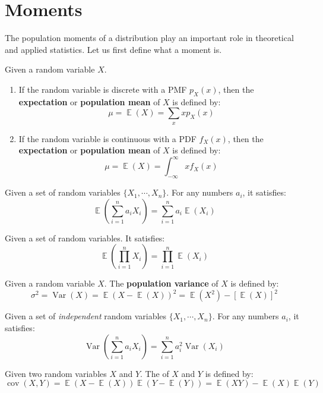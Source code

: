 \documentclass{huhtakm-template-book-v2}
\DeclareMathOperator{\E}{\mathbb{E}}
\DeclareMathOperator{\Var}{Var}
\DeclareMathOperator{\cov}{cov}
\begin{document}
\section{Moments}
The population moments of a distribution play an important role in theoretical and applied statistics. Let us first define what a moment is.
\begin{defn}
	Given a random variable $X$.
	\begin{enumerate}
		\item If the random variable is discrete with a PMF $p_{X}(x)$, then the \textbf{expectation} or \textbf{population mean} of $X$ is defined by:
		\begin{equation*}
			\mu=\E(X)=\sum_{x}xp_{X}(x)
		\end{equation*}
		\item If the random variable is continuous with a PDF $f_{X}(x)$, then the \textbf{expectation} or \textbf{population mean} of $X$ is defined by:
		\begin{equation*}
			\mu=\E(X)=\int_{-\infty}^{\infty}xf_{X}(x)
		\end{equation*}
	\end{enumerate}
\end{defn}
\begin{lem}
	Given a set of random variables $\{X_{1},\cdots,X_{n}\}$. For any numbers $a_{i}$, it satisfies:
	\begin{equation*}
		\E\left(\sum_{i=1}^{n}a_{i}X_{i}\right)=\sum_{i=1}^{n}a_{i}\E\left(X_{i}\right)
	\end{equation*}
\end{lem}
\begin{lem}
	Given a set of  random variables. It satisfies:
	\begin{equation*}
		\E\left(\prod_{i=1}^{n}X_{i}\right)=\prod_{i=1}^{n}\E(X_{i})
	\end{equation*}
\end{lem}
\begin{defn}
	Given a random variable $X$. The \textbf{population variance} of $X$ is defined by:
	\begin{equation*}
		\sigma^{2}=\Var(X)=\E(X-\E(X))^{2}=\E(X^{2})-[\E(X)]^{2}
	\end{equation*}
\end{defn}
\begin{lem}
	Given a set of \textit{independent} random variables $\{X_{1},\cdots,X_{n}\}$. For any numbers $a_{i}$, it satisfies:
	\begin{equation*}
		\Var\left(\sum_{i=1}^{n}a_{i}X_{i}\right)=\sum_{i=1}^{n}a_{i}^{2}\Var(X_{i})
	\end{equation*}
\end{lem}
\begin{defn}
	Given two random variables $X$ and $Y$. The  of $X$ and $Y$ is defined by:
	\begin{equation*}
		\cov(X,Y)=\E(X-\E(X))\E(Y-\E(Y))=\E(XY)-\E(X)\E(Y)
	\end{equation*}
\end{defn}
\end{document}
